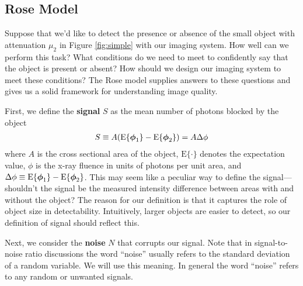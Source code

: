 \documentclass[mphy386-notes.tex]{subfiles}
\begin{document}
\subsection{Rose Model}
Suppose that we'd like to detect the presence or absence of the small object
with attenuation $\mu_2$ in Figure \ref{fig:simple} with our imaging system. How
well can we perform this task? What conditions do we need to meet to confidently
say that the object is present or absent? How should we design our imaging
system to meet these conditions? The Rose model supplies answers to these
questions and gives us a solid framework for understanding image quality.

First, we define the \textbf{signal} $S$ as the mean number of photons
blocked by the object
\begin{align}
  S \equiv A(\text{E}\{\boldsymbol{\phi}_1\} - \text{E}\{\boldsymbol{\phi}_2\}) = A\Delta\phi
\end{align}
where $A$ is the cross sectional area of the object, $\text{E}\{\cdot\}$ denotes
the expectation value, $\phi$ is the x-ray fluence in units of photons per unit
area, and $\Delta\phi \equiv \text{E}\{\boldsymbol{\phi}_1\} -
\text{E}\{\boldsymbol{\phi}_2\}$. This may seem like a peculiar way to define the
signal---shouldn't the signal be the measured intensity difference between areas
with and without the object? The reason for our definition is that it captures
the role of object size in detectability. Intuitively, larger objects are easier
to detect, so our definition of signal should reflect this.

Next, we consider the \textbf{noise} $N$ that corrupts our signal. Note that in
signal-to-noise ratio discussions the word ``noise'' usually refers to the
standard deviation of a random variable. We will use this meaning. In general
the word ``noise'' refers to any random or unwanted signals.
\end{document}
